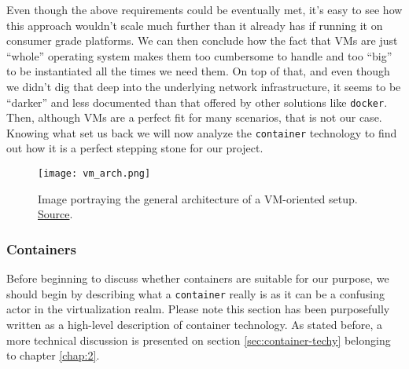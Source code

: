                 Even though the above requirements could be eventually met, it's easy to see how this approach wouldn't scale much further than it already has if running it on consumer grade platforms. We can then conclude how the fact that VMs are just ``whole'' operating system makes them too cumbersome to handle and too ``big'' to be instantiated all the times we need them. On top of that, and even though we didn't dig that deep into the underlying network infrastructure, it seems to be ``darker'' and less documented than that offered by other solutions like \texttt{docker}. Then, although VMs are a perfect fit for many scenarios, that is not our case. Knowing what set us back we will now analyze the \texttt{container} technology to find out how it is a perfect stepping stone for our project.

                \begin{figure}
                    \centering
                    \texttt{[image: vm\_arch.png]}
                    \caption{Image portraying the general architecture of a VM-oriented setup. \href{https://www.docker.com/sites/default/files/d8/2018-11/container-vm-whatcontainer_2.png}{Source}.}
                    \label{fig:vm-arch}
                \end{figure}

            \subsubsection{Containers} \label{sec:container-intro}
                Before beginning to discuss whether containers are suitable for our purpose, we should begin by describing what a \texttt{container} really is as it can be a confusing actor in the virtualization realm. Please note this section has been purposefully written as a high-level description of container technology. As stated before, a more technical discussion is presented on section \ref{sec:container-techy} belonging to chapter \ref{chap:2}.\\

